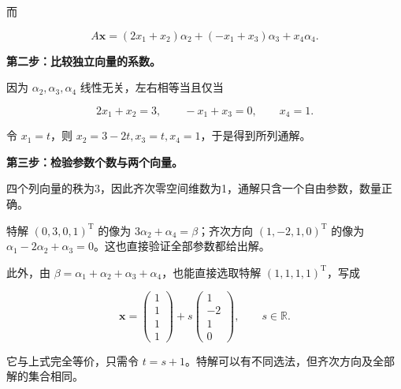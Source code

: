 \documentclass[UTF8,11pt,fontset=windows]{ctexart}
\begin{document}
而

$$
A\boldsymbol x
=(2x_1+x_2)\alpha_2+(-x_1+x_3)\alpha_3+x_4\alpha_4.
$$

\textbf{第二步：比较独立向量的系数。}

因为 $\alpha_2,\alpha_3,\alpha_4$ 线性无关，左右相等当且仅当

$$
2x_1+x_2=3,\qquad -x_1+x_3=0,\qquad x_4=1.
$$

令 $x_1=t$，则 $x_2=3-2t,x_3=t,x_4=1$，于是得到所列通解。

\textbf{第三步：检验参数个数与两个向量。}

四个列向量的秩为3，因此齐次零空间维数为1，通解只含一个自由参数，数量正确。

特解 $(0,3,0,1)^{\mathrm T}$ 的像为 $3\alpha_2+\alpha_4=\beta$；齐次方向 $(1,-2,1,0)^{\mathrm T}$ 的像为 $\alpha_1-2\alpha_2+\alpha_3=0$。这也直接验证全部参数都给出解。

此外，由 $\beta=\alpha_1+\alpha_2+\alpha_3+\alpha_4$，也能直接选取特解 $(1,1,1,1)^{\mathrm T}$，写成

$$
\boldsymbol x=\begin{pmatrix}1\\1\\1\\1\end{pmatrix}
+s\begin{pmatrix}1\\-2\\1\\0\end{pmatrix},\qquad s\in\mathbb R.
$$

它与上式完全等价，只需令 $t=s+1$。特解可以有不同选法，但齐次方向及全部解的集合相同。
\end{document}
